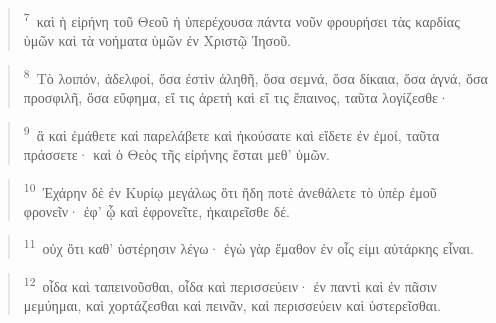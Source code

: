 \documentclass{article}
\newcommand{\currentverse}{1} %
\newcommand{\setcurrentverse}[1]{\renewcommand{\currentverse}{#1}}
\begin{document}
\begin{verse}

\setcurrentverse{7}

\setcounter{footnote}{0}

\textsuperscript{7}~καὶ ἡ εἰρήνη τοῦ Θεοῦ ἡ ὑπερέχουσα πάντα νοῦν φρουρήσει τὰς καρδίας ὑμῶν καὶ τὰ νοήματα ὑμῶν ἐν Χριστῷ Ἰησοῦ.

\end{verse}

\begin{verse}

\setcurrentverse{8}

\setcounter{footnote}{0}

\textsuperscript{8}~Τὸ λοιπόν, ἀδελφοί, ὅσα ἐστὶν ἀληθῆ, ὅσα σεμνά, ὅσα δίκαια, ὅσα ἁγνά, ὅσα προσφιλῆ, ὅσα εὔφημα, εἴ τις ἀρετὴ καὶ εἴ τις ἔπαινος, ταῦτα λογίζεσθε·

\end{verse}

\begin{verse}

\setcurrentverse{9}

\setcounter{footnote}{0}

\textsuperscript{9}~ἃ καὶ ἐμάθετε καὶ παρελάβετε καὶ ἠκούσατε καὶ εἴδετε ἐν ἐμοί, ταῦτα πράσσετε· καὶ ὁ Θεὸς τῆς εἰρήνης ἔσται μεθ’ ὑμῶν.

\end{verse}

\begin{verse}

\setcurrentverse{10}

\setcounter{footnote}{0}

\textsuperscript{10}~Ἐχάρην δὲ ἐν Κυρίῳ μεγάλως ὅτι ἤδη ποτὲ ἀνεθάλετε τὸ ὑπὲρ ἐμοῦ φρονεῖν· ἐφ’ ᾧ καὶ ἐφρονεῖτε, ἠκαιρεῖσθε δέ.

\end{verse}

\begin{verse}

\setcurrentverse{11}

\setcounter{footnote}{0}

\textsuperscript{11}~οὐχ ὅτι καθ’ ὑστέρησιν λέγω· ἐγὼ γὰρ ἔμαθον ἐν οἷς εἰμι αὐτάρκης εἶναι.

\end{verse}

\begin{verse}

\setcurrentverse{12}

\setcounter{footnote}{0}

\textsuperscript{12}~οἶδα καὶ ταπεινοῦσθαι, οἶδα καὶ περισσεύειν· ἐν παντὶ καὶ ἐν πᾶσιν μεμύημαι, καὶ χορτάζεσθαι καὶ πεινᾶν, καὶ περισσεύειν καὶ ὑστερεῖσθαι.

\end{verse}
\end{document}
